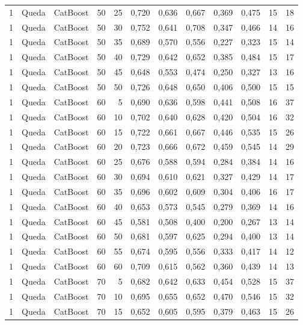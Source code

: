 \begin{longtable}{@{}rllrrrrrrrrr@{}}
1 & Queda & CatBoost & 50 & 25 & 0,720 & 0,636 & 0,667 & 0,369 & 0,475 & 15 & 18 \\
1 & Queda & CatBoost & 50 & 30 & 0,752 & 0,641 & 0,708 & 0,347 & 0,466 & 14 & 16 \\
1 & Queda & CatBoost & 50 & 35 & 0,689 & 0,570 & 0,556 & 0,227 & 0,323 & 15 & 14 \\
1 & Queda & CatBoost & 50 & 40 & 0,729 & 0,642 & 0,652 & 0,385 & 0,484 & 15 & 17 \\
1 & Queda & CatBoost & 50 & 45 & 0,648 & 0,553 & 0,474 & 0,250 & 0,327 & 13 & 16 \\
1 & Queda & CatBoost & 50 & 50 & 0,726 & 0,648 & 0,650 & 0,406 & 0,500 & 15 & 15 \\
1 & Queda & CatBoost & 60 & 5 & 0,690 & 0,636 & 0,598 & 0,441 & 0,508 & 16 & 37 \\
1 & Queda & CatBoost & 60 & 10 & 0,702 & 0,640 & 0,628 & 0,420 & 0,504 & 16 & 32 \\
1 & Queda & CatBoost & 60 & 15 & 0,722 & 0,661 & 0,667 & 0,446 & 0,535 & 15 & 26 \\
1 & Queda & CatBoost & 60 & 20 & 0,723 & 0,666 & 0,672 & 0,459 & 0,545 & 14 & 29 \\
1 & Queda & CatBoost & 60 & 25 & 0,676 & 0,588 & 0,594 & 0,284 & 0,384 & 14 & 16 \\
1 & Queda & CatBoost & 60 & 30 & 0,694 & 0,610 & 0,621 & 0,327 & 0,429 & 14 & 17 \\
1 & Queda & CatBoost & 60 & 35 & 0,696 & 0,602 & 0,609 & 0,304 & 0,406 & 16 & 17 \\
1 & Queda & CatBoost & 60 & 40 & 0,653 & 0,573 & 0,545 & 0,279 & 0,369 & 14 & 16 \\
1 & Queda & CatBoost & 60 & 45 & 0,581 & 0,508 & 0,400 & 0,200 & 0,267 & 13 & 14 \\
1 & Queda & CatBoost & 60 & 50 & 0,681 & 0,597 & 0,625 & 0,294 & 0,400 & 13 & 14 \\
1 & Queda & CatBoost & 60 & 55 & 0,674 & 0,595 & 0,556 & 0,333 & 0,417 & 14 & 12 \\
1 & Queda & CatBoost & 60 & 60 & 0,709 & 0,615 & 0,562 & 0,360 & 0,439 & 14 & 13 \\
1 & Queda & CatBoost & 70 & 5 & 0,682 & 0,642 & 0,633 & 0,454 & 0,528 & 15 & 37 \\
1 & Queda & CatBoost & 70 & 10 & 0,695 & 0,655 & 0,652 & 0,470 & 0,546 & 15 & 32 \\
1 & Queda & CatBoost & 70 & 15 & 0,652 & 0,605 & 0,595 & 0,379 & 0,463 & 15 & 26 \\

\end{longtable}
